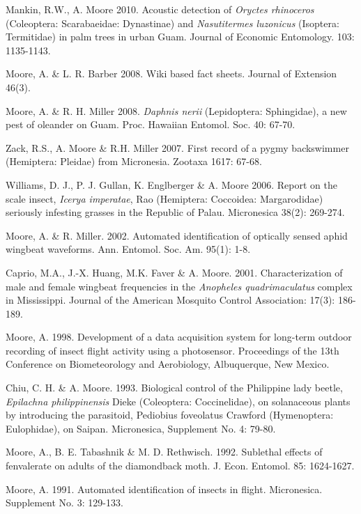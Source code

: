 \documentclass[12pt,english]{simplecv}
\begin{document}
\begin{thebibliography}{10}
Mankin, R.W., A. Moore 2010. Acoustic detection of
\emph{Oryctes rhinoceros} (Coleoptera: Scarabaeidae: Dynastinae) and
\emph{Nasutitermes luzonicus} (Isoptera: Termitidae) in palm trees
in urban Guam. Journal of Economic Entomology. 103: 1135-1143.

Moore, A. \& L. R. Barber 2008. Wiki based fact sheets.
Journal of Extension 46(3).

Moore, A. \& R. H. Miller 2008. \emph{Daphnis nerii}
(Lepidoptera: Sphingidae), a new pest of oleander on Guam. Proc. Hawaiian
Entomol. Soc. 40: 67-70.

Zack, R.S., A. Moore \& R.H. Miller 2007. First record
of a pygmy backswimmer (Hemiptera: Pleidae) from Micronesia. Zootaxa
1617: 67-68.

Williams, D. J., P. J. Gullan, K. Englberger \& A.
Moore 2006. Report on the scale insect, \emph{Icerya imperatae}, Rao
(Hemiptera: Coccoidea: Margarodidae) seriously infesting grasses in
the Republic of Palau. Micronesica 38(2): 269-274.

Moore, A. \& R. Miller. 2002. Automated identification
of optically sensed aphid wingbeat waveforms. Ann. Entomol. Soc. Am.
95(1): 1-8.

Caprio, M.A., J.-X. Huang, M.K. Faver \& A. Moore.
2001. Characterization of male and female wingbeat frequencies in
the \emph{Anopheles quadrimaculatus} complex in Mississippi. Journal
of the American Mosquito Control Association: 17(3): 186-189.

Moore, A. 1998. Development of a data acquisition
system for long-term outdoor recording of insect flight activity using
a photosensor. Proceedings of the 13th Conference on Biometeorology
and Aerobiology, Albuquerque, New Mexico.

Chiu, C. H. \& A. Moore. 1993. Biological control
of the Philippine lady beetle, \emph{Epilachna philippinensis} Dieke
(Coleoptera: Coccinelidae), on solanaceous plants by introducing the
parasitoid, Pediobius foveolatus Crawford (Hymenoptera: Eulophidae),
on Saipan. Micronesica, Supplement No. 4: 79-80. 

Moore, A., B. E. Tabashnik \& M. D. Rethwisch. 1992.
Sublethal effects of fenvalerate on adults of the diamondback moth.
J. Econ. Entomol. 85: 1624-1627. 

Moore, A. 1991. Automated identification of insects
in flight. Micronesica. Supplement No. 3: 129-133. 


\end{thebibliography}
\end{document}
